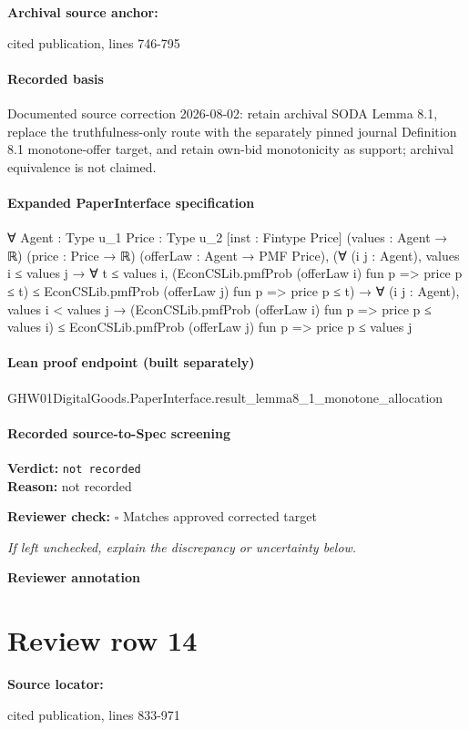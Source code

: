 \documentclass[10pt]{article}
\newcommand{\reviewerbox}{%
  \par\noindent\fbox{\parbox{0.96\linewidth}{\rule{0pt}{0.38in}}}\par
}
\newcommand{\reviewmatch}[1]{%
  \par\noindent\textbf{Reviewer check:} $\square$\; #1\par
  \noindent\emph{If left unchecked, explain the discrepancy or uncertainty below.}\par
}
\begin{document}
\textbf{Archival source anchor:} {\footnotesize\raggedright cited publication, lines 746-\allowbreak{}795\par}
\paragraph{Recorded basis}
Documented source correction 2026-\allowbreak{}08-\allowbreak{}02:\allowbreak{} retain archival SODA Lemma 8.\allowbreak{}1, replace the truthfulness-\allowbreak{}only route with the separately pinned journal Definition 8.\allowbreak{}1 monotone-\allowbreak{}offer target, and retain own-\allowbreak{}bid monotonicity as support;\allowbreak{} archival equivalence is not claimed.\allowbreak{}
\paragraph{Expanded PaperInterface specification}
\begin{ReviewVerbatim}
∀ {Agent : Type u_1} {Price : Type u_2} [inst : Fintype Price] (values : Agent → ℝ) (price : Price → ℝ)
  (offerLaw : Agent → PMF Price),
  (∀ (i j : Agent),
      values i ≤ values j →
        ∀ t ≤ values i,
          (EconCSLib.pmfProb (offerLaw i) fun p => price p ≤ t) ≤ EconCSLib.pmfProb (offerLaw j) fun p => price p ≤ t) →
    ∀ (i j : Agent),
      values i < values j →
        (EconCSLib.pmfProb (offerLaw i) fun p => price p ≤ values i) ≤
          EconCSLib.pmfProb (offerLaw j) fun p => price p ≤ values j
\end{ReviewVerbatim}

\paragraph{Lean proof endpoint (built separately)}\begin{ReviewVerbatim}
GHW01DigitalGoods.PaperInterface.result_lemma8_1_monotone_allocation
\end{ReviewVerbatim}

\paragraph{Recorded source-to-Spec screening}
\textbf{Verdict:} \texttt{not recorded}
\\
\textbf{Reason:} not recorded
\reviewmatch{Matches approved corrected target}
\noindent\textbf{Reviewer annotation}\par
\reviewerbox
\clearpage
\hypertarget{source-claim-e7742b37ea94b834}{}
\section*{Review row 14}
\textbf{Source locator:} {\footnotesize\raggedright cited publication, lines 833-\allowbreak{}971\par}
\end{document}
